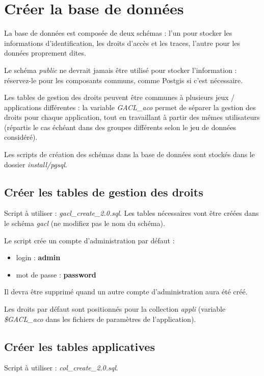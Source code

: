 \section{Créer la base de données}

La base de données est composée de deux schémas : l'un pour stocker les informations d'identification, les droits d'accès et les traces, l'autre pour les données proprement dites.

Le schéma \textit{public} ne devrait jamais être utilisé pour stocker l'information : réservez-le pour les composants communs, comme Postgis si c'est nécessaire.

Les tables de gestion des droits peuvent être communes à plusieurs jeux / applications différentes : la variable \textit{GACL\_aco} permet de séparer la gestion des droits pour chaque application, tout en travaillant à partir des mêmes utilisateurs (répartis le cas échéant dans des groupes différents selon le jeu de données considéré).

Les scripts de création des schémas dans la base de données sont stockés dans le dossier \textit{install/pgsql}. 



\subsection{Créer les tables de gestion des droits}
Script à utiliser : \textit{gacl\_create\_2.0.sql}. Les tables nécessaires vont être créées dans le schéma \textit{gacl} (ne modifiez pas le nom du schéma).

Le script crée un compte d'administration par défaut :
\begin{itemize}
\item login : \textbf{admin}
\item mot de passe : \textbf{password}
\end{itemize}

Il devra être supprimé quand un autre compte d'administration aura été créé.

Les droits par défaut sont positionnés pour la collection \textit{appli} (variable \textit{\$GACL\_aco} dans les fichiers de paramètres de l'application).


\subsection{Créer les tables applicatives}
Script à utiliser : \textit{col\_create\_2.0.sql}.

